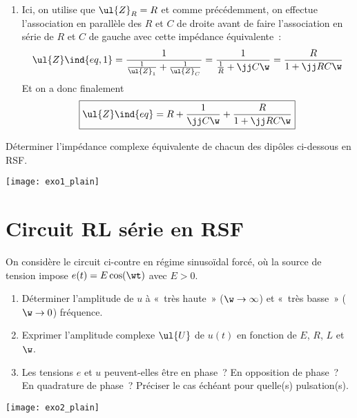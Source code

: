\documentclass[a4paper, 12pt, final, garamond]{book}
\begin{document}
{{\begin{answ}
\begin{enumerate}
				\item Ici, on utilise que $\ul{Z}_R = R$ et comme précédemment, on effectue
				      l'association en parallèle des $R$ et $C$ de droite avant de faire
				      l'association en série de $R$ et $C$ de gauche avec cette impédance
				      équivalente~:
				      \begin{gather*}
					      \ul{Z}\ind{eq, 1}
					      = \frac{1}{\frac{1}{\ul{Z}_1} + \frac{1}{\ul{Z}_C}}
					      = \frac{1}{\frac{1}{R} + \jj C\w}
					      = \frac{R}{1 + \jj RC\w}
				      \end{gather*}
				      Et on a donc finalement
				      \begin{gather*}
					      \boxed{
						      \ul{Z}\ind{eq} = R + \frac{1}{\jj C\w} + \frac{R}{1 + \jj RC\w}}
				      \end{gather*}
			\end{enumerate}
		\end{answ}%
	}{ %
		Déterminer l'impédance complexe équivalente de chacun des dipôles ci-dessous
		en RSF.
		\begin{center}
			\texttt{[image: exo1\_plain]}
		\end{center}
	}
}

\section{Circuit RL série en RSF}
On considère le circuit ci-contre en régime sinusoïdal forcé, où la source de
tension impose $e(t) = E\cos(\wt)$ avec $E > 0$.

\begin{minipage}{0.60\linewidth}
	\begin{enumerate}
		\item Déterminer l'amplitude de $u$ à «~très haute~» ($\w\rightarrow\infty$)
		      et «~très basse~» ($\w\rightarrow0$) fréquence.
		\item Exprimer l'amplitude complexe $\ul{U}$ de $u(t)$ en fonction de $E$,
		      $R$, $L$ et $\w$.
		\item Les tensions $e$ et $u$ peuvent-elles être en phase~? En opposition de
		      phase~? En quadrature de phase~? Préciser le cas échéant pour quelle(s)
		      pulsation(s).
	\end{enumerate}
\end{minipage}
\hfill
\begin{minipage}{0.35\linewidth}
	\begin{center}
		\texttt{[image: exo2\_plain]}
	\end{center}
\end{minipage}
\end{document}

